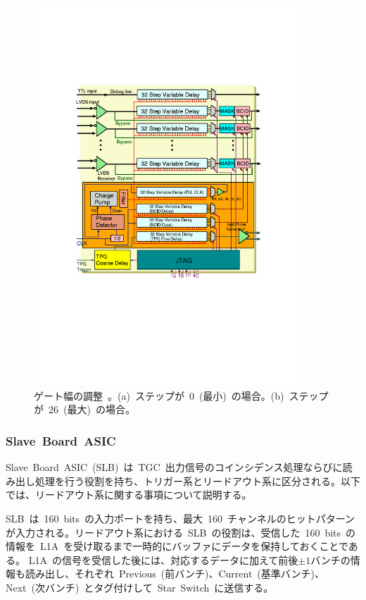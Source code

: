 \begin{figure}[H]
        \begin{minipage}{0.49\hsize}
        \centering
        \includegraphics[width=0.9\textwidth,page=4]{img/pdf/PP.pdf}
        \subcaption{}
        \end{minipage}
        \caption[ゲート幅の調整]{ゲート幅の調整~\cite{URL:05}。(a)~ステップが~0~(最小)~の場合。(b)~ステップが~26~(最大)~の場合。}
        \label{fig:bcidgate}
\end{figure}

\subsubsection{Slave~Board~ASIC}
Slave~Board~ASIC~(SLB)~は~TGC~出力信号のコインシデンス処理ならびに読み出し処理を行う役割を持ち、トリガー系とリードアウト系に区分される。以下では、リードアウト系に関する事項について説明する。

SLB~は~160~bits~の入力ポートを持ち、最大~160~チャンネルのヒットパターンが入力される。リードアウト系における~SLB~の役割は、受信した~160~bits~の情報を~L1A~を受け取るまで一時的にバッファにデータを保持しておくことである。
L1A~の信号を受信した後には、対応するデータに加えて前後$\pm1$バンチの情報も読み出し、それぞれ~Previous~(前バンチ)、Current~(基準バンチ)、Next~(次バンチ)~とタグ付けして~Star~Switch~に送信する。

